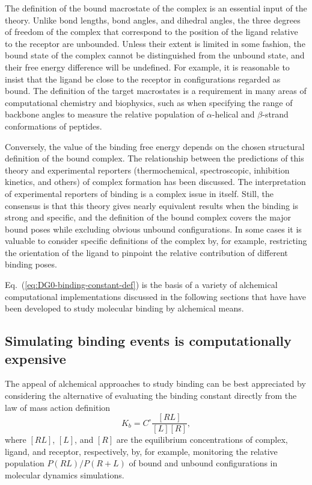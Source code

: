\documentclass[9pt,bestpractices,pubversion]{livecoms}
\begin{document}
The definition of the bound macrostate of the complex is an essential input of the theory. Unlike bond lengths, bond angles, and dihedral angles, the three degrees of freedom of the complex that correspond to the position of the ligand relative to the receptor are unbounded. Unless their extent is limited in some fashion, the bound state of the complex cannot be distinguished from the unbound state, and their free energy difference will be undefined. For example, it is reasonable to insist that the ligand be close to the receptor in configurations regarded as bound. The definition of the target macrostates is a requirement in many areas of computational chemistry and biophysics, such as when specifying the range of backbone angles to measure the relative population of $\alpha$-helical and $\beta$-strand conformations of peptides.  

Conversely, the value of the binding free energy depends on the chosen structural definition of the bound complex. The relationship between the predictions of this theory and experimental reporters (thermochemical, spectroscopic, inhibition kinetics, and others) of complex formation has been discussed.\cite{gilson1997statisticalthermodynamic,mihailescu2004theory,gallicchio2011recentadv,simonson2016physical,gallicchio2021comppeptsci} The interpretation of experimental reporters of binding is a complex issue in itself. Still, the consensus is that this theory gives nearly equivalent results when the binding is strong and specific, and the definition of the bound complex covers the major bound poses while excluding obvious unbound configurations. In some cases it is valuable to consider specific definitions of the complex by, for example, restricting the orientation of the ligand to pinpoint the relative contribution of different binding poses.

Eq.~(\ref{eq:DG0-binding-constant-def}) is the basis of a variety of alchemical computational implementations discussed in the following sections that have have been developed to study molecular binding by alchemical means.

\subsection{Simulating binding events is computationally expensive}

The appeal of alchemical approaches to study binding can be best appreciated by considering the alternative of evaluating the binding constant directly from the law of mass action definition
\begin{equation}\label{eq:law-mass-action}
 K_b = C^{\circ}\frac{[RL]}{[L][R]},
\end{equation}
where $[RL]$, $[L]$, and $[R]$ are the equilibrium concentrations of complex, ligand, and receptor, respectively, by, for example, monitoring the relative population $P(RL)/P(R+L)$ of bound and unbound configurations in molecular dynamics simulations.~\cite{jong2011determining,pan2017quantitative}
\end{document}
